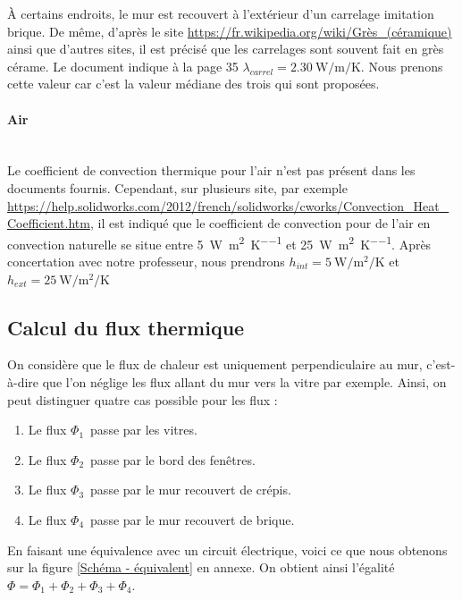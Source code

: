 \documentclass[12pt, a4paper]{article}
\newcommand{\hInt}{\ensuremath{h_{int}}}
\newcommand{\hExt}{\ensuremath{h_{ext}}}
\newcommand{\phiUn}{\ensuremath{\Phi_{1}}}
\newcommand{\phiDeux}{\ensuremath{\Phi_{2}}}
\newcommand{\phiTrois}{\ensuremath{\Phi_{3}}}
\newcommand{\phiQuatre}{\ensuremath{\Phi_{4}}}
\newcommand{\lambdaCarrel}{\ensuremath{\lambda_{carrel}}}
\begin{document}
\bigskip

À certains endroits, le mur est recouvert à l'extérieur d'un carrelage imitation brique. De même, d'après le site \href{https://fr.wikipedia.org/wiki/Grès_(céramique)}{https://fr.wikipedia.org/wiki/Grès\_(céramique)} ainsi que d'autres sites, il est précisé que les carrelages sont souvent fait en grès cérame. Le document indique à la page 35 $\boxed{\lambdaCarrel = \SI{2.30}{\watt\per\meter\per\kelvin}}$. Nous prenons cette valeur car c'est la valeur médiane des trois qui sont proposées.

\paragraph{Air} \phantom{.} \\

Le coefficient de convection thermique pour l'air n'est pas présent dans les documents fournis. Cependant, sur plusieurs site, par exemple \url{https://help.solidworks.com/2012/french/solidworks/cworks/Convection_Heat_Coefficient.htm}, il est indiqué que le coefficient de convection pour de l'air en convection naturelle se situe entre \SI{5}{\watt\per\meter\squared\per\kelvin} et \SI{25}{\watt\per\meter\squared\per\kelvin}. Après concertation avec notre professeur, nous prendrons $\boxed{\hInt = \SI{5}{\watt\per\meter\squared\per\kelvin} }$ et $\boxed{\hExt = \SI{25}{\watt\per\meter\squared\per\kelvin} }$

\subsection{Calcul du flux thermique}

On considère que le flux de chaleur est uniquement perpendiculaire au mur, c'est-à-dire que l'on néglige les flux allant du mur vers la vitre par exemple. Ainsi, on peut distinguer quatre cas possible pour les flux :

\begin{enumerate}
\item Le flux \phiUn\ passe par les vitres.
\item Le flux \phiDeux\ passe par le bord des fenêtres.
\item Le flux \phiTrois\ passe par le mur recouvert de crépis.
\item Le flux \phiQuatre\ passe par le mur recouvert de brique.
\end{enumerate}

En faisant une équivalence avec un circuit électrique, voici ce que nous obtenons sur la figure \ref{Schéma - équivalent} en annexe. On obtient ainsi l'égalité $\Phi = \phiUn + \phiDeux + \phiTrois + \phiQuatre$.
\end{document}
